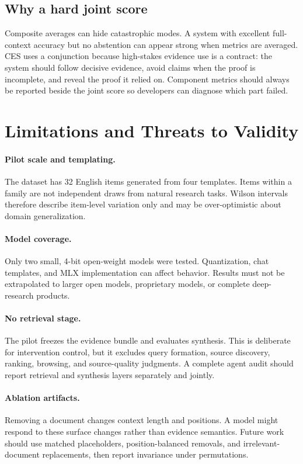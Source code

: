 \documentclass[10pt,twocolumn]{article}
\begin{document}
\subsection{Why a hard joint score}

Composite averages can hide catastrophic modes. A system with excellent full-context accuracy but no abstention can appear strong when metrics are averaged. CES uses a conjunction because high-stakes evidence use is a contract: the system should follow decisive evidence, avoid claims when the proof is incomplete, and reveal the proof it relied on. Component metrics should always be reported beside the joint score so developers can diagnose which part failed.

\section{Limitations and Threats to Validity}

\paragraph{Pilot scale and templating.}
The dataset has 32 English items generated from four templates. Items within a family are not independent draws from natural research tasks. Wilson intervals therefore describe item-level variation only and may be over-optimistic about domain generalization.

\paragraph{Model coverage.}
Only two small, 4-bit open-weight models were tested. Quantization, chat templates, and MLX implementation can affect behavior. Results must not be extrapolated to larger open models, proprietary models, or complete deep-research products.

\paragraph{No retrieval stage.}
The pilot freezes the evidence bundle and evaluates synthesis. This is deliberate for intervention control, but it excludes query formation, source discovery, ranking, browsing, and source-quality judgments. A complete agent audit should report retrieval and synthesis layers separately and jointly.

\paragraph{Ablation artifacts.}
Removing a document changes context length and positions. A model might respond to these surface changes rather than evidence semantics. Future work should use matched placeholders, position-balanced removals, and irrelevant-document replacements, then report invariance under permutations.
\end{document}
